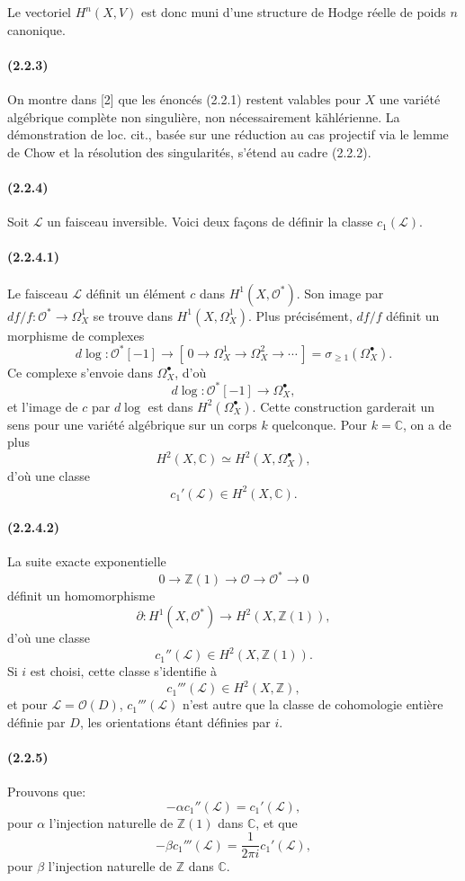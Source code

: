 \documentclass[10pt]{article}
\newcommand{\C}{\mathbb C}
\newcommand{\Z}{\mathbb Z}
\providecommand{\cO}{\mathcal O}
\providecommand{\cL}{\mathcal L}
\providecommand{\cO}{\mathcal O}
\providecommand{\cL}{\mathcal L}
\newcommand{\dlog}{d\log}
\begin{document}
Le vectoriel $H^n(X,V)$ est donc muni d'une structure de Hodge réelle de poids $n$ canonique.

\paragraph{(2.2.3)} On montre dans [2] que les énoncés (2.2.1) restent valables pour $X$ une variété algébrique complète non singulière, non nécessairement kählérienne. La démonstration de loc. cit., basée sur une réduction au cas projectif via le lemme de Chow et la résolution des singularités, s'étend au cadre (2.2.2).

\paragraph{(2.2.4)} Soit $\cL$ un faisceau inversible. Voici deux façons de définir la classe $c_1(\cL)$.

\paragraph{(2.2.4.1)} Le faisceau $\cL$ définit un élément $c$ dans $H^1(X,\cO^*)$. Son image par $df/f:\cO^*\to\Omega_X^1$ se trouve dans $H^1(X,\Omega_X^1)$. Plus précisément, $df/f$ définit un morphisme de complexes
\[
\dlog:\cO^*[-1]\longrightarrow [\,0\to\Omega_X^1\to\Omega_X^2\to\cdots\,]=\sigma_{\ge1}(\Omega_X^\bullet).
\]
Ce complexe s'envoie dans $\Omega_X^\bullet$, d'où
\[
\dlog:\cO^*[-1]\longrightarrow\Omega_X^\bullet,
\]
et l'image de $c$ par $\dlog$ est dans $H^2(\Omega_X^\bullet)$. Cette construction garderait un sens pour une variété algébrique sur un corps $k$ quelconque. Pour $k=\C$, on a de plus
\[
H^2(X,\C)\simeq H^2(X,\Omega_X^\bullet),
\]
d'où une classe
\[
c_1'(\cL)\in H^2(X,\C).
\]

\paragraph{(2.2.4.2)} La suite exacte exponentielle
\[
0\to\Z(1)\to\cO\to\cO^*\to0
\]
définit un homomorphisme
\[
\partial:H^1(X,\cO^*)\longrightarrow H^2(X,\Z(1)),
\]
d'où une classe
\[
c_1''(\cL)\in H^2(X,\Z(1)).
\]
Si $i$ est choisi, cette classe s'identifie à
\[
c_1'''(\cL)\in H^2(X,\Z),
\]
et pour $\cL=\cO(D)$, $c_1'''(\cL)$ n'est autre que la classe de cohomologie entière définie par $D$, les orientations étant définies par $i$.

\paragraph{(2.2.5)} Prouvons que:
\[
\tag{2.2.5.1}
-\alpha c_1''(\cL)=c_1'(\cL),
\]
pour $\alpha$ l'injection naturelle de $\Z(1)$ dans $\C$, et que
\[
\tag{2.2.5.2}
-\beta c_1'''(\cL)=\frac{1}{2\pi i}c_1'(\cL),
\]
pour $\beta$ l'injection naturelle de $\Z$ dans $\C$.
\end{document}
